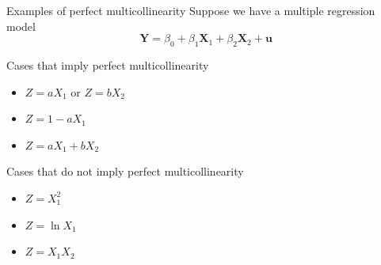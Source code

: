 \documentclass[presentation,10pt]{beamer}
\begin{document}
\begin{frame}[label={sec:orgbe4d796}]{Examples of perfect multicollinearity}
Suppose we have a multiple regression model
\[ \mathbf{Y} = \beta_0 + \beta_1 \mathbf{X}_1 + \beta_2
\mathbf{X}_2 + \mathbf{u}  \]

\begin{block}{Cases that imply perfect multicollinearity}
\begin{itemize}
\item \(Z = a X_1\) or \(Z = b X_2\)
\item \(Z = 1 - a X_1\)
\item \(Z = a X_1 + b X_2\)
\end{itemize}
\end{block}

\begin{block}{Cases that do not imply perfect multicollinearity}
\begin{itemize}
\item \(Z = X_1^2\)
\item \(Z = \ln X_1\)
\item \(Z = X_1 X_2\)
\end{itemize}
\end{block}
\end{frame}
\end{document}
